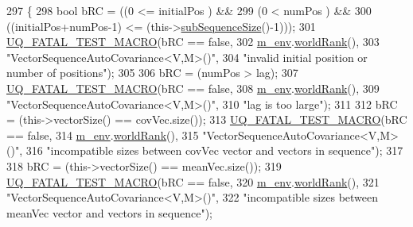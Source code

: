 \begin{DoxyCode}
297 \{
298   \textcolor{keywordtype}{bool} bRC = ((0                     <= initialPos                 ) &&
299               (0                     <  numPos                     ) &&
300               ((initialPos+numPos-1) <= (this->\hyperlink{class_q_u_e_s_o_1_1_array_of_sequences_a007d00d2398007b9bac82ed23eedb1e2}{subSequenceSize}()-1)));
301   \hyperlink{_defines_8h_a56d63d18d0a6d45757de47fcc06f574d}{UQ\_FATAL\_TEST\_MACRO}(bRC == \textcolor{keyword}{false},
302                       \hyperlink{class_q_u_e_s_o_1_1_base_vector_sequence_a8e8824d2a63c5a43bcc6473e3a0491e8}{m\_env}.\hyperlink{class_q_u_e_s_o_1_1_base_environment_a78b57112bbd0e6dd0e8afec00b40ffa7}{worldRank}(),
303                       \textcolor{stringliteral}{"VectorSequenceAutoCovariance<V,M>()"},
304                       \textcolor{stringliteral}{"invalid initial position or number of positions"});
305 
306   bRC = (numPos > lag);
307   \hyperlink{_defines_8h_a56d63d18d0a6d45757de47fcc06f574d}{UQ\_FATAL\_TEST\_MACRO}(bRC == \textcolor{keyword}{false},
308                       \hyperlink{class_q_u_e_s_o_1_1_base_vector_sequence_a8e8824d2a63c5a43bcc6473e3a0491e8}{m\_env}.\hyperlink{class_q_u_e_s_o_1_1_base_environment_a78b57112bbd0e6dd0e8afec00b40ffa7}{worldRank}(),
309                       \textcolor{stringliteral}{"VectorSequenceAutoCovariance<V,M>()"},
310                       \textcolor{stringliteral}{"lag is too large"});
311 
312   bRC = (this->vectorSize() == covVec.size());
313   \hyperlink{_defines_8h_a56d63d18d0a6d45757de47fcc06f574d}{UQ\_FATAL\_TEST\_MACRO}(bRC == \textcolor{keyword}{false},
314                       \hyperlink{class_q_u_e_s_o_1_1_base_vector_sequence_a8e8824d2a63c5a43bcc6473e3a0491e8}{m\_env}.\hyperlink{class_q_u_e_s_o_1_1_base_environment_a78b57112bbd0e6dd0e8afec00b40ffa7}{worldRank}(),
315                       \textcolor{stringliteral}{"VectorSequenceAutoCovariance<V,M>()"},
316                       \textcolor{stringliteral}{"incompatible sizes between covVec vector and vectors in sequence"});
317 
318   bRC = (this->vectorSize() == meanVec.size());
319   \hyperlink{_defines_8h_a56d63d18d0a6d45757de47fcc06f574d}{UQ\_FATAL\_TEST\_MACRO}(bRC == \textcolor{keyword}{false},
320                       \hyperlink{class_q_u_e_s_o_1_1_base_vector_sequence_a8e8824d2a63c5a43bcc6473e3a0491e8}{m\_env}.\hyperlink{class_q_u_e_s_o_1_1_base_environment_a78b57112bbd0e6dd0e8afec00b40ffa7}{worldRank}(),
321                       \textcolor{stringliteral}{"VectorSequenceAutoCovariance<V,M>()"},
322                       \textcolor{stringliteral}{"incompatible sizes between meanVec vector and vectors in sequence"});

\end{DoxyCode}
